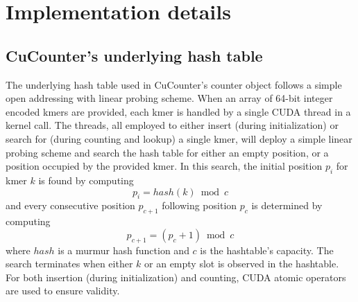 \section*{Implementation details}

\subsection*{CuCounter's underlying hash table}
The underlying hash table used in CuCounter's counter object follows a simple open addressing with linear probing scheme.
When an array of 64-bit integer encoded kmers are provided, each kmer is handled by a single CUDA thread in a kernel call.
The threads, all employed to either insert (during initialization) or search for (during counting and lookup) a single kmer, will deploy a simple linear probing scheme and search the hash table for either an empty position, or a position occupied by the provided kmer.
In this search, the initial position $p_i$ for kmer $k$ is found by computing
\begin{equation}
  p_i=hash(k) \bmod c
\end{equation}
and every consecutive position $p_{c+1}$ following position $p_c$ is determined by computing
\begin{equation}
  p_{c+1}=(p_c+1) \bmod c
\end{equation}
where $hash$ is a murmur hash function and $c$ is the hashtable's capacity.
The search terminates when either $k$ or an empty slot is observed in the hashtable.
For both insertion (during initialization) and counting, CUDA atomic operators are used to ensure validity.



